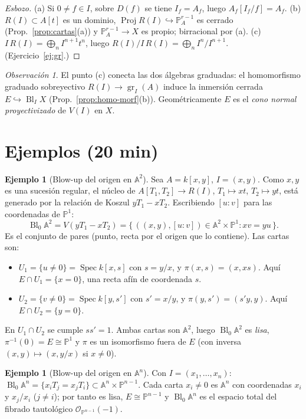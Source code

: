 \documentclass[11pt,a4paper]{article}
\newcommand{\Spec}{\operatorname{Spec}}
\newcommand{\Proj}{\operatorname{Proj}}
\newcommand{\Bl}{\operatorname{Bl}}
\newcommand{\gr}{\operatorname{gr}}
\newcommand{\A}{\mathbb{A}}
\newcommand{\PP}{\mathbb{P}}
\newcommand{\cO}{\mathcal{O}}
\theoremstyle{plain}
\theoremstyle{definition}
\newtheorem{ejemplo}[teorema]{Ejemplo}
\theoremstyle{remark}
\newtheorem{observacion}[teorema]{Observación}
\begin{document}
\begin{proof}[Esbozo]
(a) Si $0\neq f\in I$, sobre $D(f)$ se tiene $I_f=A_f$, luego $A_f[I_f/f]=A_f$. (b) $R(I)\subset A[t]$ es un dominio, $\Proj R(I)\hookrightarrow\PP^{r-1}_A$ es cerrado (Prop.~\ref{prop:cartas}(a)) y $\PP^{r-1}_A\to X$ es propio; birracional por (a). (c) $I\,R(I)=\bigoplus_n I^{n+1}t^n$, luego $R(I)/I\,R(I)=\bigoplus_nI^n/I^{n+1}$. (Ejercicio~\ref{ej:gr}.)
\end{proof}

\begin{observacion}
El punto (c) conecta las dos álgebras graduadas: el homomorfismo graduado sobreyectivo $R(I)\to\gr_I(A)$ induce la inmersión cerrada $E\hookrightarrow\Bl_IX$ (Prop.~\ref{prop:homo-morf}(b)). Geométricamente $E$ es el \emph{cono normal proyectivizado} de $V(I)$ en $X$.
\end{observacion}

\section{Ejemplos (20 min)}

\begin{ejemplo}[Blow-up del origen en $\A^2$]\label{ej:A2}
Sea $A=k[x,y]$, $I=(x,y)$. Como $x,y$ es una sucesión regular, el núcleo de $A[T_1,T_2]\to R(I)$, $T_1\mapsto xt$, $T_2\mapsto yt$, está generado por la relación de Koszul $yT_1-xT_2$. Escribiendo $[u:v]$ para las coordenadas de $\PP^1$:
\[
\Bl_0\A^2=V(yT_1-xT_2)=\{\,((x,y),[u:v])\in\A^2\times\PP^1 : xv=yu\,\}.
\]
Es el conjunto de pares (punto, recta por el origen que lo contiene). Las cartas son:
\begin{itemize}
\item $U_1=\{u\neq0\}=\Spec k[x,s]$ con $s=y/x$, y $\pi(x,s)=(x,xs)$. Aquí $E\cap U_1=\{x=0\}$, una recta afín de coordenada $s$.
\item $U_2=\{v\neq0\}=\Spec k[y,s']$ con $s'=x/y$, y $\pi(y,s')=(s'y,y)$. Aquí $E\cap U_2=\{y=0\}$.
\end{itemize}
En $U_1\cap U_2$ se cumple $ss'=1$. Ambas cartas son $\A^2$, luego $\Bl_0\A^2$ es \emph{lisa}, $\pi^{-1}(0)=E\cong\PP^1$ y $\pi$ es un isomorfismo fuera de $E$ (con inversa $(x,y)\mapsto(x,y/x)$ si $x\neq0$).
\end{ejemplo}

\begin{ejemplo}[Blow-up del origen en $\A^n$]
Con $I=(x_1,\dots,x_n)$: $\Bl_0\A^n=\{x_iT_j=x_jT_i\}\subset\A^n\times\PP^{n-1}$. Cada carta $x_i\neq0$ es $\A^n$ con coordenadas $x_i$ y $x_j/x_i$ ($j\ne i$); por tanto es lisa, $E\cong\PP^{n-1}$ y $\Bl_0\A^n$ es el espacio total del fibrado tautológico $\cO_{\PP^{n-1}}(-1)$.
\end{ejemplo}
\end{document}
